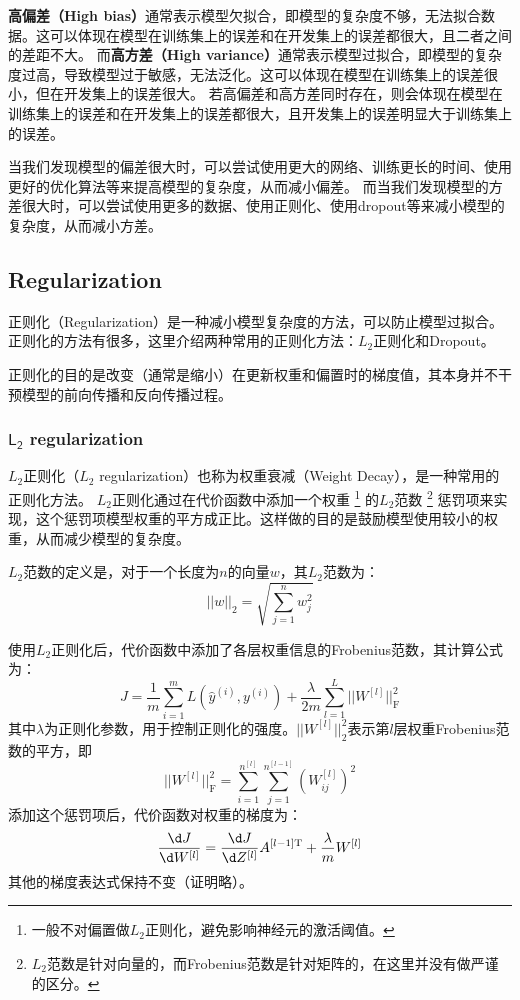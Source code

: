 \textbf{高偏差（High bias）}通常表示模型欠拟合，即模型的复杂度不够，无法拟合数据。这可以体现在模型在训练集上的误差和在开发集上的误差都很大，且二者之间的差距不大。
而\textbf{高方差（High variance）}通常表示模型过拟合，即模型的复杂度过高，导致模型过于敏感，无法泛化。这可以体现在模型在训练集上的误差很小，但在开发集上的误差很大。
若高偏差和高方差同时存在，则会体现在模型在训练集上的误差和在开发集上的误差都很大，且开发集上的误差明显大于训练集上的误差。

当我们发现模型的偏差很大时，可以尝试使用更大的网络、训练更长的时间、使用更好的优化算法等来提高模型的复杂度，从而减小偏差。
而当我们发现模型的方差很大时，可以尝试使用更多的数据、使用正则化、使用dropout等来减小模型的复杂度，从而减小方差。

\subsection{Regularization}

正则化（Regularization）是一种减小模型复杂度的方法，可以防止模型过拟合。
正则化的方法有很多，这里介绍两种常用的正则化方法：$L_2$正则化和Dropout。

\begin{hint}
    正则化的目的是改变（通常是缩小）在更新权重和偏置时的梯度值，其本身并不干预模型的前向传播和反向传播过程。
\end{hint}

\subsubsection{$\mathsf{L_2}$ regularization}

$L_2$正则化（$L_2$ regularization）也称为权重衰减（Weight Decay），是一种常用的正则化方法。
$L_2$正则化通过在代价函数中添加一个权重
\footnote{一般不对偏置做$L_2$正则化，避免影响神经元的激活阈值。}
的$L_2$范数
\footnote{$L_2$范数是针对向量的，而Frobenius范数是针对矩阵的，在这里并没有做严谨的区分。}
惩罚项来实现，这个惩罚项模型权重的平方成正比。这样做的目的是鼓励模型使用较小的权重，从而减少模型的复杂度。

$L_2$范数的定义是，对于一个长度为$n$的向量$w$，其$L_2$范数为：
\begin{equation}
    ||w||_2 = \sqrt{\sum_{j=1}^nw_j^2}
\end{equation}

使用$L_2$正则化后，代价函数中添加了各层权重信息的Frobenius范数，其计算公式为：
\begin{equation}
    J = \frac{1}{m}\sum_{i=1}^mL(\hat{y}^{(i)}, y^{(i)}) + \frac{\lambda}{2m}\sum_{l=1}^L||W^{[l]}||_{\mathrm{F}}^2
\end{equation}
其中$\lambda$为正则化参数，用于控制正则化的强度。$||W^{[l]}||_2^2$表示第$l$层权重Frobenius范数的平方，即
\begin{equation}
    ||W^{[l]}||_{\mathrm{F}}^2 = \sum_{i=1}^{n^{[l]}}\sum_{j=1}^{n^{[l-1]}}(W_{ij}^{[l]})^2
\end{equation}
添加这个惩罚项后，代价函数对权重的梯度为：
\begin{equation}
    \frac{\d J}{\d W^{[l]}} = \frac{\d J}{\d Z^{[l]}} A^{[l-1] \mathrm{T}} + \frac{\lambda}{m}W^{[l]}
\end{equation}
其他的梯度表达式保持不变（证明略）。

